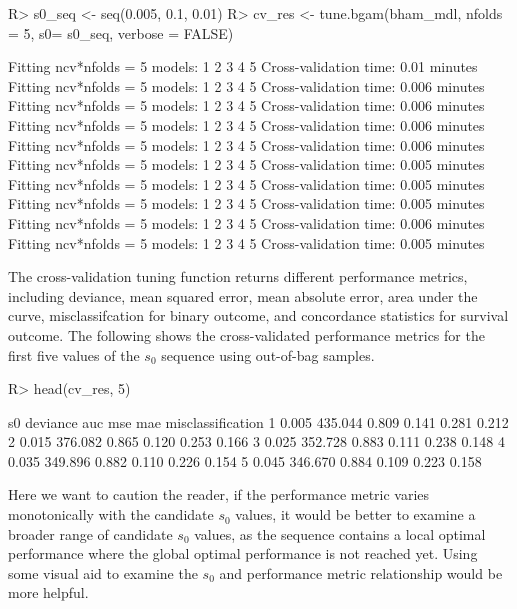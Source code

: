 \documentclass[
]{jss}
\begin{document}
\begin{CodeChunk}
\begin{CodeInput}
R> s0_seq <- seq(0.005, 0.1, 0.01)
R> cv_res <- tune.bgam(bham_mdl, nfolds = 5, s0= s0_seq, verbose = FALSE)
\end{CodeInput}
\begin{CodeOutput}
Fitting ncv*nfolds = 5 models: 
1 2 3 4 5 
 Cross-validation time: 0.01 minutes 
Fitting ncv*nfolds = 5 models: 
1 2 3 4 5 
 Cross-validation time: 0.006 minutes 
Fitting ncv*nfolds = 5 models: 
1 2 3 4 5 
 Cross-validation time: 0.006 minutes 
Fitting ncv*nfolds = 5 models: 
1 2 3 4 5 
 Cross-validation time: 0.006 minutes 
Fitting ncv*nfolds = 5 models: 
1 2 3 4 5 
 Cross-validation time: 0.006 minutes 
Fitting ncv*nfolds = 5 models: 
1 2 3 4 5 
 Cross-validation time: 0.005 minutes 
Fitting ncv*nfolds = 5 models: 
1 2 3 4 5 
 Cross-validation time: 0.005 minutes 
Fitting ncv*nfolds = 5 models: 
1 2 3 4 5 
 Cross-validation time: 0.005 minutes 
Fitting ncv*nfolds = 5 models: 
1 2 3 4 5 
 Cross-validation time: 0.006 minutes 
Fitting ncv*nfolds = 5 models: 
1 2 3 4 5 
 Cross-validation time: 0.005 minutes 
\end{CodeOutput}
\end{CodeChunk}

The cross-validation tuning function returns different performance
metrics, including deviance, mean squared error, mean absolute error,
area under the curve, misclassifcation for binary outcome, and
concordance statistics for survival outcome. The following shows the
cross-validated performance metrics for the first five values of the
\(s_0\) sequence using out-of-bag samples.

\begin{CodeChunk}
\begin{CodeInput}
R> head(cv_res, 5)
\end{CodeInput}
\begin{CodeOutput}
     s0 deviance   auc   mse   mae misclassification
1 0.005  435.044 0.809 0.141 0.281             0.212
2 0.015  376.082 0.865 0.120 0.253             0.166
3 0.025  352.728 0.883 0.111 0.238             0.148
4 0.035  349.896 0.882 0.110 0.226             0.154
5 0.045  346.670 0.884 0.109 0.223             0.158
\end{CodeOutput}
\end{CodeChunk}

Here we want to caution the reader, if the performance metric varies
monotonically with the candidate \(s_0\) values, it would be better to
examine a broader range of candidate \(s_0\) values, as the sequence
contains a local optimal performance where the global optimal
performance is not reached yet. Using some visual aid to examine the
\(s_0\) and performance metric relationship would be more helpful.
\end{document}
